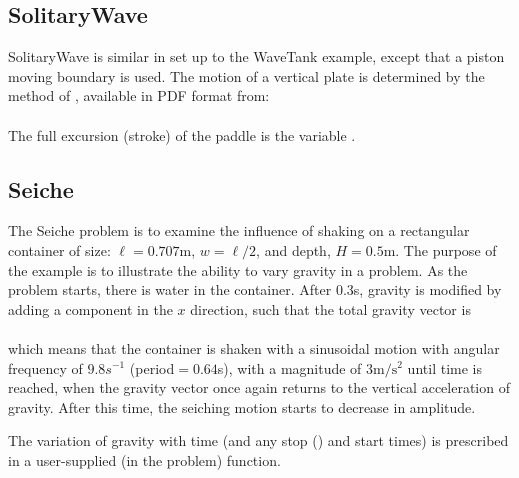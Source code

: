 \documentclass{../GPUSPHtemplate}
\begin{document}
\subsection{SolitaryWave}

SolitaryWave is similar in set up to the WaveTank example, except that a
piston moving boundary is used. The motion of a vertical plate is
determined by the method of \cite{goring_tsunamis_1979}, available in PDF format
from:\\ 
\\
The full excursion (stroke) of the paddle is the variable .

\subsection{Seiche}

The Seiche problem is to examine the influence of shaking on a
rectangular container of size: $\ell = 0.707$m, $w = \ell/2$, and depth,
$H = 0.5$m. The purpose of the example is to illustrate the ability to
vary gravity in a problem. As the problem starts, there is water in the
container. After $0.3$s, gravity is modified by adding a component in
the $x$ direction, such that the total gravity vector is \\
\\ which means that the container is shaken with a sinusoidal
motion with angular frequency of $9.8s^{-1}$ (period${} = 0.64$s),
with a magnitude of $3\text{m}/\text{s}^2$ until time 
is reached, when the gravity vector once again returns to the vertical
acceleration of gravity. After this time, the seiching motion starts to
decrease in amplitude.

\iffalse
\begin{figure}[h]
\centering{%
\texttt{[image: Seiche.png]}%
}
\caption{Resonant seiching in a rectangular domain showing the results
of a time varying gravity in the problem, \cmd{Seiche.cc}. Here the tank has
been shaking side to side at the resonant frequency of $0.638$s. The
color coding is for the pressure in the fluid.}
\end{figure}
\else
\fi

The variation of gravity with time (and any stop () and
start times) is prescribed in a user-supplied (in the problem)
 function.
\end{document}
